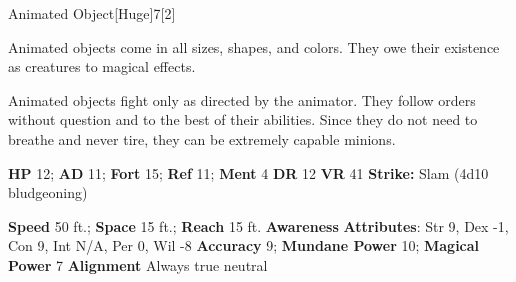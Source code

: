   
  \begin{monsection}{Animated Object}[Huge]{7}[2]
    \vspace{-1em}\vspace{-1em}
    \vspace{0em}

    
    Animated objects come in all sizes, shapes, and colors. They owe their existence as creatures to magical effects.

    Animated objects fight only as directed by the animator. They follow orders without question and to the best of their abilities. Since they do not need to breathe and never tire, they can be extremely capable minions.
  
    

    \begin{spellcontent}
      \begin{spelltargetinginfo}
        \pari \textbf{HP} 12;
          \textbf{AD} 11;
          \textbf{Fort} 15;
          \textbf{Ref} 11;
          \textbf{Ment} 4
        \pari \textbf{DR} 12
        \pari \textbf{VR} 41
        \pari \textbf{Strike:}
            Slam  (4d10 bludgeoning)
      \end{spelltargetinginfo}
    \end{spellcontent}
    \begin{monsterfooter}
      \pari \textbf{Speed} 50 ft.;
        \textbf{Space} 15 ft.;
        \textbf{Reach} 15 ft.
      \pari \textbf{Awareness} 
      \pari \textbf{Attributes}:
        Str 9, Dex -1,
        Con 9, Int N/A,
        Per 0, Wil -8
      \pari \textbf{Accuracy} 9;
        \textbf{Mundane Power} 10;
      \textbf{Magical Power} 7
      \pari \textbf{Alignment} Always true neutral
    \end{monsterfooter}
  \end{monsection}
  
